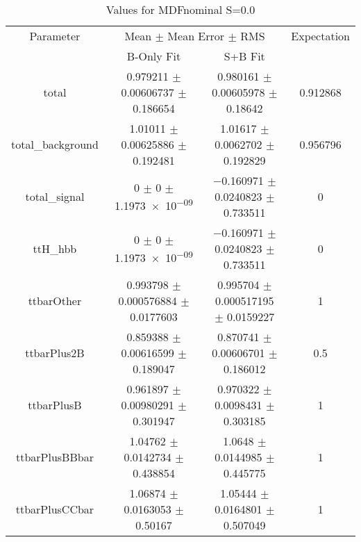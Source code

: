 \begin{table}
\centering
\caption{Values for MDFnominal S=0.0}
\begin{tabular}{cccc}
\toprule
Parameter & \multicolumn{2}{c}{Mean $\pm$ Mean Error $\pm$ RMS} & Expectation\\
 & B-Only Fit & S+B Fit & \\
\midrule
total & \num{0.979211} $\pm$ \num{0.00606737} $\pm$ \num{0.186654} & \num{0.980161} $\pm$ \num{0.00605978} $\pm$ \num{0.18642} & \num{0.912868}\\
total\_background & \num{1.01011} $\pm$ \num{0.00625886} $\pm$ \num{0.192481} & \num{1.01617} $\pm$ \num{0.0062702} $\pm$ \num{0.192829} & \num{0.956796}\\
total\_signal & \num{0} $\pm$ \num{0} $\pm$ \num{1.1973e-09} & \num{-0.160971} $\pm$ \num{0.0240823} $\pm$ \num{0.733511} & \num{0}\\
ttH\_hbb & \num{0} $\pm$ \num{0} $\pm$ \num{1.1973e-09} & \num{-0.160971} $\pm$ \num{0.0240823} $\pm$ \num{0.733511} & \num{0}\\
ttbarOther & \num{0.993798} $\pm$ \num{0.000576884} $\pm$ \num{0.0177603} & \num{0.995704} $\pm$ \num{0.000517195} $\pm$ \num{0.0159227} & \num{1}\\
ttbarPlus2B & \num{0.859388} $\pm$ \num{0.00616599} $\pm$ \num{0.189047} & \num{0.870741} $\pm$ \num{0.00606701} $\pm$ \num{0.186012} & \num{0.5}\\
ttbarPlusB & \num{0.961897} $\pm$ \num{0.00980291} $\pm$ \num{0.301947} & \num{0.970322} $\pm$ \num{0.0098431} $\pm$ \num{0.303185} & \num{1}\\
ttbarPlusBBbar & \num{1.04762} $\pm$ \num{0.0142734} $\pm$ \num{0.438854} & \num{1.0648} $\pm$ \num{0.0144985} $\pm$ \num{0.445775} & \num{1}\\
ttbarPlusCCbar & \num{1.06874} $\pm$ \num{0.0163053} $\pm$ \num{0.50167} & \num{1.05444} $\pm$ \num{0.0164801} $\pm$ \num{0.507049} & \num{1}\\
\bottomrule
\end{tabular}
\end{table}